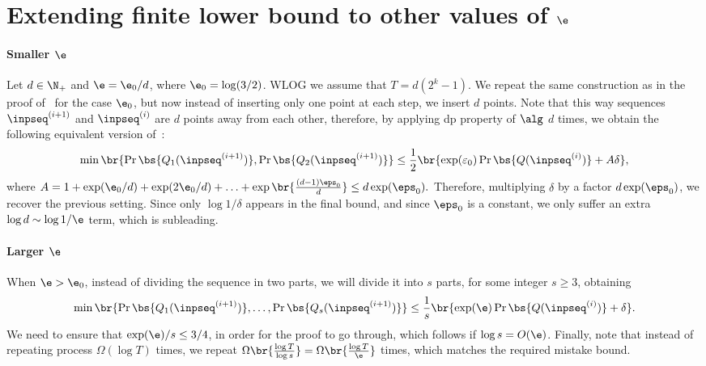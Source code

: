 \section{Extending finite lower bound to other values of \(\e\)}
\label{app:all-eps}
\paragraph{Smaller \(\e\)}
Let \(d \in \N_+\) and \(\e = \e_0 / d\), where \(\e_0 = \log(3/2)\).
WLOG we assume that \(T = d (2^k - 1)\). 
We repeat the same construction as in the proof of~ for the case \(\e_0\),
but now instead of inserting only one point at each step, we insert \(d\) points.
Note that this way sequences \(\inpseq^{(i+1)}\) and \(\inpseq^{(i)}\) are \(d\) points away from each other, therefore, by applying \Gls{dp} property of \(\alg\) \(d\) times, 
we obtain the following equivalent version of~:
\begin{equation}
    \min\br{\Pr\bs{Q_1(\inpseq^{(i+1)})}, \Pr\bs{Q_2(\inpseq^{(i+1)})}}
    \leq \frac{1}{2} \br{\exp(\varepsilon_0) \Pr\bs{Q(\inpseq^{(i)})} + A\delta},
\end{equation}
where \(A = 1 + \exp(\e_0 / d) + \exp(2\e_0 / d) + \ldots + \exp\br{\frac{(d - 1)\eps_0}{d}} \leq d \exp(\eps_0).\)
Therefore, multiplying \(\delta\) by a factor \(d \exp(\eps_0)\), we recover the previous setting. 
Since only \(\log 1 / \delta\) appears in the final bound, and since \(\eps_0\) is a constant, we only suffer an extra \(\log d \sim \log 1 / \e\) term,
which is subleading.

\paragraph{Larger \(\e\)}
When \(\e > \e_0\), instead of dividing the sequence in two parts, we will divide it into \(s\) parts, for some integer \(s \geq 3\), obtaining
\begin{equation}
    \min\br{\Pr\bs{Q_1(\inpseq^{(i+1)})}, \ldots, \Pr\bs{Q_s(\inpseq^{(i+1)})}}
    \leq \frac{1}{s} \br{\exp(\e) \Pr\bs{Q(\inpseq^{(i)})} + \delta}.
\end{equation}
We need to ensure that \(\exp(\e) / s \leq 3/4\), in order for the proof to go through, which follows if \(\log s = O(\e)\). 
Finally, note that instead of repeating process \(\Omega(\log T)\) times, we repeat \(\Omega\br{\frac{\log T}{\log s}} = \Omega\br{\frac{\log T}{\e}}\) times,
which matches the required mistake bound.